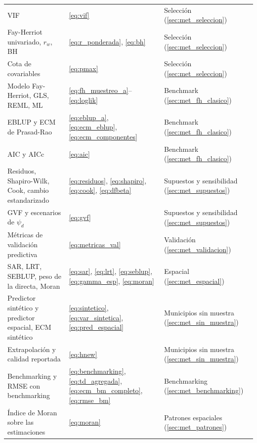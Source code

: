 \begin{table}[!htbp]
\begin{tabularx}{\linewidth}{>{\raggedright\arraybackslash}X >{\raggedright\arraybackslash}p{3.2cm} >{\raggedright\arraybackslash}p{4.6cm}}
VIF & \ref{eq:vif} & Selección (\ref{sec:met_seleccion}) \\
Fay-Herriot univariado, $r_w$, BH & \ref{eq:r_ponderada}, \ref{eq:bh} & Selección (\ref{sec:met_seleccion}) \\
Cota de covariables & \ref{eq:pmax} & Selección (\ref{sec:met_seleccion}) \\
Modelo Fay-Herriot, GLS, REML, ML & \ref{eq:fh_muestreo_a}--\ref{eq:loglik} & Benchmark (\ref{sec:met_fh_clasico}) \\
EBLUP y ECM de Prasad-Rao & \ref{eq:eblup_a}, \ref{eq:ecm_eblup}, \ref{eq:ecm_componentes} & Benchmark (\ref{sec:met_fh_clasico}) \\
AIC y AICc & \ref{eq:aic} & Benchmark (\ref{sec:met_fh_clasico}) \\
Residuos, Shapiro-Wilk, Cook, cambio estandarizado & \ref{eq:residuos}, \ref{eq:shapiro}, \ref{eq:cook}, \ref{eq:dfbeta} & Supuestos y sensibilidad (\ref{sec:met_supuestos}) \\
GVF y escenarios de $\psi_d$ & \ref{eq:gvf} & Supuestos y sensibilidad (\ref{sec:met_supuestos}) \\
Métricas de validación predictiva & \ref{eq:metricas_val} & Validación (\ref{sec:met_validacion}) \\
SAR, LRT, SEBLUP, peso de la directa, Moran & \ref{eq:sar}, \ref{eq:lrt}, \ref{eq:seblup}, \ref{eq:gamma_esp}, \ref{eq:moran} & Espacial (\ref{sec:met_espacial}) \\
Predictor sintético y predictor espacial, ECM sintético & \ref{eq:sintetico}, \ref{eq:var_sintetica}, \ref{eq:pred_espacial} & Municipios sin muestra (\ref{sec:met_sin_muestra}) \\
Extrapolación y calidad reportada & \ref{eq:hnew} & Municipios sin muestra (\ref{sec:met_sin_muestra}) \\
Benchmarking y RMSE con benchmarking & \ref{eq:benchmarking}, \ref{eq:td_agregada}, \ref{eq:ecm_bm_completo}, \ref{eq:rmse_bm} & Benchmarking (\ref{sec:met_benchmarking}) \\
Índice de Moran sobre las estimaciones & \ref{eq:moran} & Patrones espaciales (\ref{sec:met_patrones}) \\
\bottomrule
\end{tabularx}
\end{table}
\FloatBarrier
